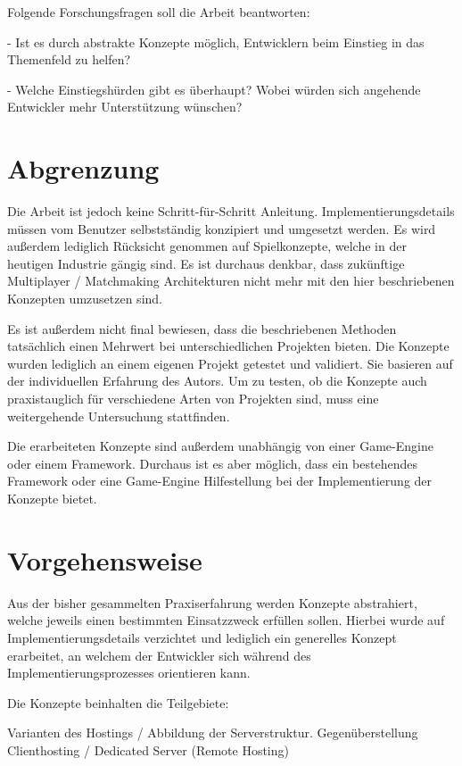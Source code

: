 Folgende Forschungsfragen soll die Arbeit beantworten:

- Ist es durch abstrakte Konzepte möglich, Entwicklern beim Einstieg in das Themenfeld zu helfen? 

- Welche Einstiegshürden gibt es überhaupt? Wobei würden sich angehende Entwickler mehr Unterstützung wünschen?

\section{Abgrenzung}

Die Arbeit ist jedoch keine Schritt-für-Schritt Anleitung. Implementierungsdetails müssen vom Benutzer selbstständig konzipiert und umgesetzt werden. Es wird außerdem lediglich Rücksicht genommen auf Spielkonzepte, welche in der heutigen Industrie gängig sind. Es ist durchaus denkbar, dass zukünftige Multiplayer / Matchmaking Architekturen nicht mehr mit den hier beschriebenen Konzepten umzusetzen sind.

Es ist außerdem nicht final bewiesen, dass die beschriebenen Methoden tatsächlich einen Mehrwert bei unterschiedlichen Projekten bieten. Die Konzepte wurden lediglich an einem eigenen Projekt getestet und validiert. Sie basieren auf der individuellen Erfahrung des Autors. Um zu testen, ob die Konzepte auch praxistauglich für verschiedene Arten von Projekten sind, muss eine weitergehende Untersuchung stattfinden.

Die erarbeiteten Konzepte sind außerdem unabhängig von einer Game-Engine oder einem Framework. Durchaus ist es aber möglich, dass ein bestehendes Framework oder eine Game-Engine Hilfestellung bei der Implementierung der Konzepte bietet. 


\section{Vorgehensweise}

Aus der bisher gesammelten Praxiserfahrung werden Konzepte abstrahiert, welche jeweils einen bestimmten Einsatzzweck erfüllen sollen. Hierbei wurde auf Implementierungsdetails verzichtet und lediglich ein generelles Konzept erarbeitet, an welchem der Entwickler sich während des Implementierungsprozesses orientieren kann.

Die Konzepte beinhalten die Teilgebiete: 

Varianten des Hostings / Abbildung der Serverstruktur. Gegenüberstellung Clienthosting / Dedicated Server (Remote Hosting)


